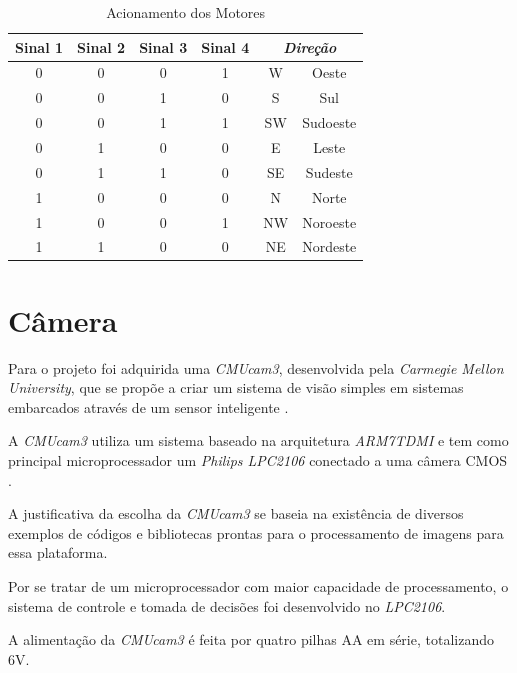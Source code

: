 \begin{table}[h!]
    \centering
    \begin{tabular}{|c|c|c|c|c|c|} \hline
        \textbf{Sinal 1} & \textbf{Sinal 2} & \textbf{Sinal 3} & \textbf{Sinal 4} & \multicolumn{2}{|c|}{\textit{Direção}} \\ \hline
        0 & 0 & 0 & 1 & W & Oeste \\ \hline
        0 & 0 & 1 & 0 & S & Sul \\ \hline
        0 & 0 & 1 & 1 & SW & Sudoeste \\ \hline
        0 & 1 & 0 & 0 & E & Leste \\ \hline
        0 & 1 & 1 & 0 & SE & Sudeste \\ \hline
        1 & 0 & 0 & 0 & N & Norte \\ \hline
        1 & 0 & 0 & 1 & NW & Noroeste \\ \hline
        1 & 1 & 0 & 0 & NE & Nordeste \\ \hline
    \end{tabular}
    \caption{Acionamento dos Motores}
    \label{sen_tbl01}
\end{table}

\section{Câmera}
\label{sec_camera}

Para o projeto foi adquirida uma \textit{CMUcam3}, desenvolvida pela \textit{Carmegie Mellon University}, que se propõe a criar um sistema de visão simples em sistemas embarcados através de um sensor inteligente \cite{cmucam01}.

A \textit{CMUcam3} utiliza um sistema baseado na arquitetura \textit{ARM7TDMI} e tem como principal microprocessador um \textit{Philips LPC2106} conectado a uma câmera CMOS \cite{cmucam02}.

A justificativa da escolha da \textit{CMUcam3} se baseia na existência de diversos exemplos de códigos e bibliotecas prontas para o processamento de imagens para essa plataforma.

Por se tratar de um microprocessador com maior capacidade de processamento, o sistema de controle e tomada de decisões foi desenvolvido no \textit{LPC2106}.

A alimentação da \textit{CMUcam3} é feita por quatro pilhas AA em série, totalizando 6V. 


